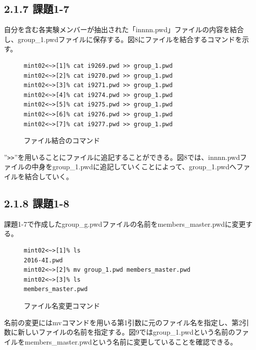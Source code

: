 \documentclass[12pt]{jreport}
\begin{document}
            \subsection*{2.1.7 課題1-7}
                自分を含む各実験メンバーが抽出された「innnn.pwd」ファイルの内容を結合し、group\_1.pwdファイルに保存する。図8にファイルを結合するコマンドを示す。
                \begin{figure}[H]
                    \begin{center}
                        \begin{screen}
                            \begin{verbatim}
mint02<~>[1]% cat i9269.pwd >> group_1.pwd
mint02<~>[2]% cat i9270.pwd >> group_1.pwd
mint02<~>[3]% cat i9271.pwd >> group_1.pwd
mint02<~>[4]% cat i9274.pwd >> group_1.pwd
mint02<~>[5]% cat i9275.pwd >> group_1.pwd
mint02<~>[6]% cat i9276.pwd >> group_1.pwd
mint02<~>[7]% cat i9277.pwd >> group_1.pwd
                            \end{verbatim}
                        \end{screen}
                        \caption{ファイル結合のコマンド}
                        \label{8}
                    \end{center}
                \end{figure}
                ''\verb|>|\verb|>|''を用いることにファイルに追記することができる。図8では、innnn.pwdファイルの中身をgroup\_1.pwdに追記していくことによって、group\_1.pwdへファイルを結合していく。

            \subsection*{2.1.8 課題1-8}
                課題1-7で作成したgroup\_g.pwdファイルの名前をmembers\_master.pwdに変更する。
                \begin{figure}[H]
                    \begin{center}
                        \begin{screen}
                            \begin{verbatim}
mint02<~>[1]% ls
2016-4I.pwd
mint02<~>[2]% mv group_1.pwd members_master.pwd
mint02<~>[3]% ls
members_master.pwd
                            \end{verbatim}
                        \end{screen}
                        \caption{ファイル名変更コマンド}
                        \label{9}
                    \end{center}
                \end{figure}
                名前の変更にはmvコマンドを用いる第1引数に元のファイル名を指定し、第2引数に新しいファイルの名前を指定する。図9ではgroup\_1.pwdという名前のファイルをmembers\_master.pwdという名前に変更していることを確認できる。
\end{document}
